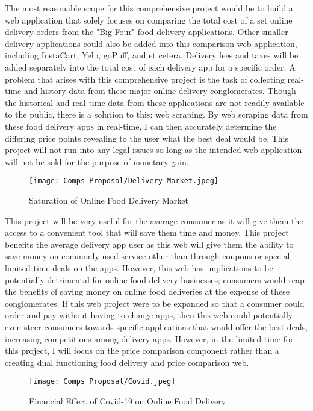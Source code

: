 \documentclass[10pt,twocolumn]{article}
\begin{document}
The most reasonable scope for this comprehensive project would be to build a web application that solely focuses on comparing the total cost of a set online delivery orders from the "Big Four" food delivery applications. Other smaller delivery applications could also be added into this comparison web application, including InstaCart, Yelp, goPuff, and et cetera. Delivery fees and taxes will be added separately into the total cost of each delivery app for a specific order. A problem that arises with this comprehensive project is the task of collecting real-time and history data from these major online delivery conglomerates. Though the historical and real-time data from these applications are not readily available to the public, there is a solution to this: web scraping. By web scraping data from these food delivery apps in real-time, I can then accurately determine the differing price points revealing to the user what the best deal would be. This project will not run into any legal issues so long as the intended web application will not be sold for the purpose of monetary gain.

\begin{figure}
    \centering
    \texttt{[image: Comps Proposal/Delivery Market.jpeg]}
    \caption{
        Saturation of Online Food Delivery Market
    }
    \label{fig:second-page}
\end{figure}

This project will be very useful for the average consumer as it will give them the access to a convenient tool that will save them time and money. This project benefits the average delivery app user as this web will give them the ability to save money on commonly used service other than through coupons or special limited time deals on the apps. However, this web has implications to be potentially detrimental for online food delivery businesses; consumers would reap the benefits of saving money on online food deliveries at the expense of these conglomerates. If this web project were to be expanded so that a consumer could order and pay without having to change apps, then this web could potentially even steer consumers towards specific applications that would offer the best deals, increasing competitions among delivery apps. However, in the limited time for this project, I will focus on the price comparison component rather than a creating dual functioning food delivery and price comparison web.

\begin{figure}
    \centering
    \texttt{[image: Comps Proposal/Covid.jpeg]}
    \caption{
        Financial Effect of Covid-19 on Online Food Delivery
    }
    \label{fig:second-page-1}
\end{figure}  
\end{document}

